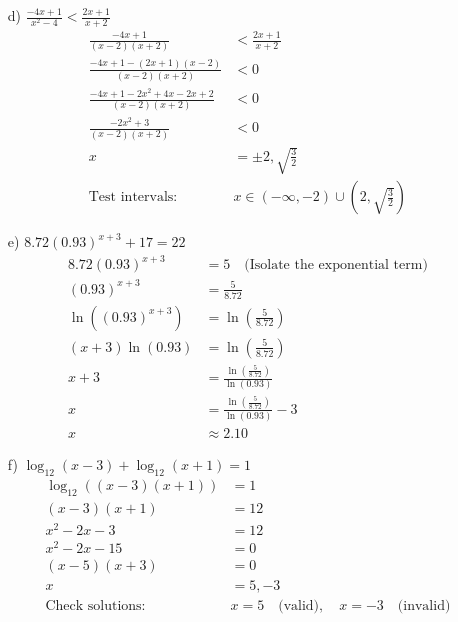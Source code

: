 \documentclass{article}
\newenvironment{solution}{\color{solutioncolor}}{}
\begin{document}
\begin{enumerate}
\begin{solution}
    \end{solution}
    
    \item[d)] $\frac{-4x+1}{x^2-4} < \frac{2x+1}{x+2}$
    \begin{solution}
        \begin{align*}
            \frac{-4x + 1}{(x - 2)(x + 2)} &< \frac{2x + 1}{x + 2} \\
            \frac{-4x + 1 - (2x + 1)(x - 2)}{(x - 2)(x + 2)} &< 0 \\
            \frac{-4x + 1 - 2x^2 + 4x - 2x + 2}{(x - 2)(x + 2)} &< 0 \\
            \frac{-2x^2 + 3}{(x - 2)(x + 2)} &< 0 \\
            x &= \pm 2, \sqrt{\frac{3}{2}} \\
            \text{Test intervals:} & x \in (-\infty, -2) \cup (2, \sqrt{\frac{3}{2}})
        \end{align*}
    \end{solution}
    
    \item[e)] $8.72(0.93)^{x+3} + 17 = 22$
    \begin{solution}
        \begin{align*}
            8.72(0.93)^{x+3} &= 5 \quad \text{(Isolate the exponential term)} \\
            (0.93)^{x+3} &= \frac{5}{8.72} \\
            \ln((0.93)^{x+3}) &= \ln\left(\frac{5}{8.72}\right) \\
            (x+3)\ln(0.93) &= \ln\left(\frac{5}{8.72}\right) \\
            x+3 &= \frac{\ln\left(\frac{5}{8.72}\right)}{\ln(0.93)} \\
            x &= \frac{\ln(\frac{5}{ 8.72})}{\ln(0.93)} - 3 \\
            x &\approx 2.10
        \end{align*}
    \end{solution}
    
    \item[f)] $\log_{12}(x-3)+\log_{12}(x+1)=1$
    \begin{solution}
        \begin{align*}
            \log_{12}((x-3)(x+1)) &= 1 \\
            (x-3)(x+1) &= 12 \\
            x^2 - 2x - 3 &= 12 \\
            x^2 - 2x - 15 &= 0 \\
            (x-5)(x+3) &= 0 \\
            x &= 5, -3 \\
            \text{Check solutions:} & x = 5 \quad \text{(valid)}, \quad x = -3 \quad \text{(invalid)}
        \end{align*}
    \end{solution}
    

\end{enumerate}
\end{document}
